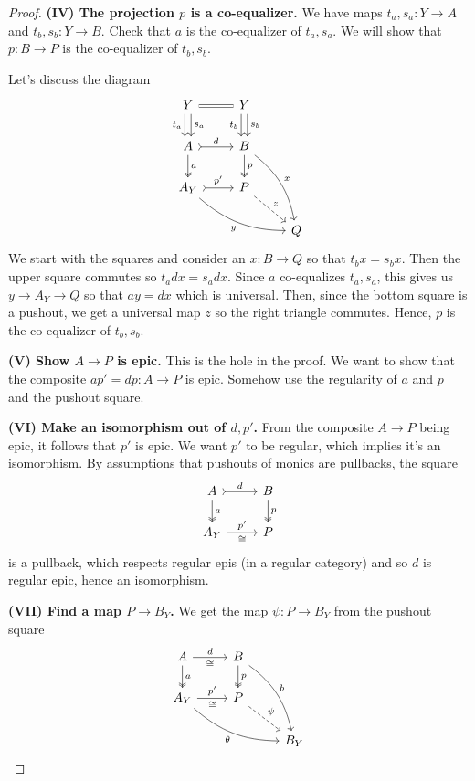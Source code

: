 \documentclass[12pt]{article}
\newcommand{\from}{\colon}
\renewcommand{\(}{\left(}
\renewcommand{\)}{\right)}
\renewcommand{\{}{\left\lbrace}
\renewcommand{\}}{\right\rbrace}
\theoremstyle{remark}
\theoremstyle{definition}
\begin{document}
\begin{proof}
 	\textbf{(IV) The projection $p$ is a co-equalizer.} We have maps $t_a,s_a \from Y \to A$ and $t_b,s_b \from Y \to B$.  Check that $a$ is the co-equalizer of $t_a,s_a$.  We will show that $p \from B \to P$ is the co-equalizer of $t_b,s_b$.  
 	
 	Let's discuss the diagram
 	\[
	 \begin{tikzcd}
		 {Y} 
			\ar[r,equal]
			\ar[d,shift left=1,"s_a"]
			\ar[d,shift left=-1,swap,"t_a"]&
		 {Y} 
			 \ar[d,shift left=1,"s_b"]
			 \ar[d,shift left=-1,swap,"t_b"]&
		 {} \\
		 {A} 
			 \ar[r,rightarrowtail,"d"]
			 \ar[d,twoheadrightarrow,"a"] &
		 {B} 
			 \ar[d,twoheadrightarrow,"p"] 
			 \ar[ddr,bend left=20,"x"]&
		 {} \\
		 {A_Y} 
			 \ar[r,rightarrowtail,"p'"]
			 \ar[rrd,bend right=20,swap,"y"] &
		 {P} 
			 \ar[dr,dashed,"z"]&
		 {} \\
		 {} &
		 {} &
		 {Q} 
	 \end{tikzcd}
 	\]
 	We start with the squares and consider an $x \from B \to Q$ so that $t_bx=s_bx$.  Then the upper square commutes so $t_adx=s_adx$. Since $a$ co-equalizes $t_a,s_a$, this gives us $y \to A_Y \to Q$ so that $ay=dx$ which is universal.  Then, since the bottom square is a pushout, we get a universal map $z$ so the right triangle commutes.  Hence, $p$ is the co-equalizer of $t_b,s_b$.
 	
 	\textbf{(V) Show $A \to P$ is epic.} This is the hole in the proof.  We want to show that the composite $ap'=dp \from A \to P$ is epic.  Somehow use the regularity of $a$ and $p$ and the pushout square.
 	
 	\textbf{(VI) Make an isomorphism out of $d,p'$.} From the composite $A \to P$ being epic, it follows that $p'$ is epic.  We want $p'$ to be regular, which implies it's an isomorphism.  By assumptions that pushouts of monics are pullbacks, the square
 	\[
 	\begin{tikzcd}
	 	{A} 
		 	\ar[r,rightarrowtail,"d"]
		 	\ar[d,twoheadrightarrow,"a"] &
	 	{B} 
		 	\ar[d,twoheadrightarrow,"p"] \\
	 	{A_Y} 
		 	\ar[r,"p'","\cong"'] &
	 	{P} 
 	\end{tikzcd}
 	\] 
 	is a pullback, which respects regular epis (in a regular category) and so $d$ is regular epic, hence an isomorphism.
 	
 	\textbf{(VII) Find a map $P \to B_Y$.} We get the map $\psi \from P \to B_Y$ from the pushout square
 	\[
 	\begin{tikzcd}
	 	{A} 
		 	\ar[r,"d", "\cong"']
		 	\ar[d,twoheadrightarrow,"a"] &
	 	{B} 
		 	\ar[d,twoheadrightarrow,"p"] 
		 	\ar[ddr,bend left=20,"b"] &
		{}\\
	 	{A_Y} 
		 	\ar[r,"p'","\cong"'] 
		 	\ar[rrd,bend right=20,"\theta"'] &
	 	{P} 
		 	\ar[rd,dashed,"\psi"]\\
	 	{} &
	 	{} &
	 	{B_Y} 
 	\end{tikzcd}
 	\]
 	

\end{proof}
\end{document}
